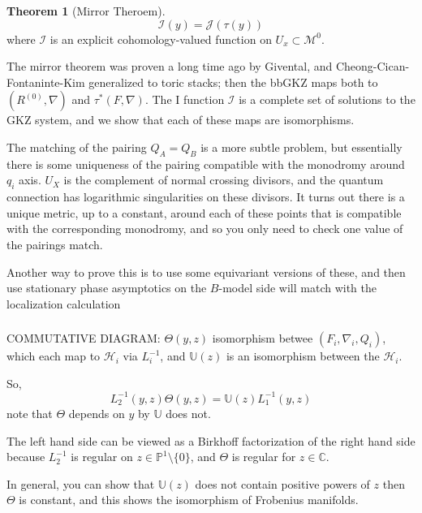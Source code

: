 \documentclass{amsart}
\theoremstyle{definition}
\newtheorem{theorem}[dummy]{Theorem}
\newcommand{\I}{\mathcal{I}}
\newcommand{\proj}{\mathbb{P}}
\newcommand{\J}{\mathcal{J}}
\newcommand{\M}{\mathcal{M}}
\newcommand{\C}{\mathbb{C}}
\begin{document}
\begin{theorem}[Mirror Theroem]
$$\I(y)=\J(\tau(y))$$
where $\I$ is an explicit cohomology-valued function on $U_x\subset \M^0$.
\end{theorem}

The mirror theorem was proven a long time ago by Givental, and Cheong-Cican-Fontaninte-Kim generalized to toric stacks; then the
bbGKZ maps both to $(R^{(0)},\nabla)$ and $\tau^*(F,\nabla)$.  The I function $\I$ is a complete set of solutions to the GKZ system, and we show that each of these maps are isomorphisms.

The matching of the pairing $Q_A=Q_B$ is a more subtle problem, but essentially there is some uniqueness of the pairing compatible with the monodromy around $q_i$ axis.  $U_X$ is the complement of normal crossing divisors, and the quantum connection has logarithmic singularities on these divisors.  It turns out there is a unique metric, up to a constant, around each of these points that is compatible with the corresponding monodromy, and so you only need to check one value of the pairings match.

Another way to prove this is to use some equivariant versions of these, and then use stationary phase asymptotics on the $B$-model side will match with the localization calculation

\subsubsection{}

COMMUTATIVE DIAGRAM: $\Theta(y,z)$ isomorphism betwee $(F_i, \nabla_i, Q_i)$, which each map to $\mathcal{H}_i$ via $L_i^{-1}$, and $\mathbb{U}(z)$ is an isomorphism between the $\mathcal{H}_i$.

So,
$$L_2^{-1}(y,z)\Theta(y,z)=\mathbb{U}(z)L_1^{-1}(y,z)$$
note that $\Theta$ depends on $y$ by $\mathbb{U}$ does not.

The left hand side can be viewed as a Birkhoff factorization of the right hand side because $L_2^{-1}$ is regular on $z\in\proj^1\setminus\{0\}$, and $\Theta$ is regular for $z\in \C$.

In general, you can show that $\mathbb{U}(z)$ does not contain positive powers of $z$ then $\Theta$ is constant, and this shows the isomorphism of Frobenius manifolds.  
\end{document}

